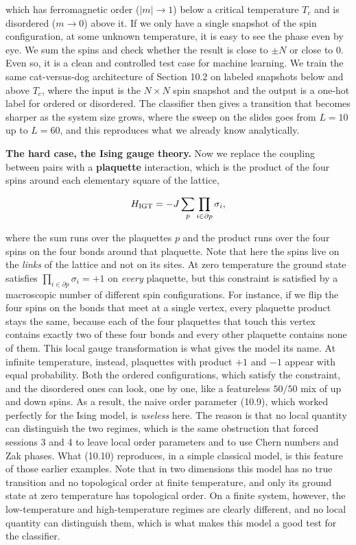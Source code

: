 which has ferromagnetic order ($|m|\to 1$) below a critical temperature $T_c$ and is disordered
($m\to 0$) above it. If we only have a single snapshot of the spin configuration, at some unknown
temperature, it is easy to see the phase even by eye. We sum the spins and check whether the
result is close to $\pm N$ or close to $0$. Even so, it is a clean and controlled test case for
machine learning. We train the same cat-versus-dog architecture of Section 10.2 on labeled
snapshots below and above $T_c$, where the input is the $N\times N$ spin snapshot and the output is
a one-hot label for ordered or disordered. The classifier then gives a transition that becomes
sharper as the system size grows, where the sweep on the slides goes from $L = 10$ up to $L = 60$,
and this reproduces what we already know analytically.

\textbf{The hard case, the Ising gauge theory.} Now we replace the coupling between pairs with a
\textbf{plaquette} interaction, which is the product of the four spins around each elementary square
of the lattice,

\begin{equation}
H_{\rm IGT} = -J\sum_{p} \prod_{i \in \partial p} \sigma_i,
\end{equation}

where the sum runs over the plaquettes $p$ and the product runs over the four spins on the four
bonds around that plaquette. Note that here the spins live on the \emph{links} of the lattice and
not on its sites. At zero temperature the ground state satisfies $\prod_{i\in\partial p}\sigma_i =
+1$ on \emph{every} plaquette, but this constraint is satisfied by a macroscopic number of different
spin configurations. For instance, if we flip the four spins on the bonds that meet at a single
vertex, every plaquette product stays the same, because each of the four plaquettes that touch this
vertex contains exactly two of these four bonds and every other plaquette contains none of them.
This local gauge transformation is what gives the model its name. At infinite temperature, instead,
plaquettes with product $+1$ and $-1$ appear with equal probability. Both the ordered
configurations, which satisfy the constraint, and the disordered ones can look, one by one, like a
featureless $50/50$ mix of up and down spins. As a result, the naive order parameter (10.9), which
worked perfectly for the Ising model, is \emph{useless} here. The reason is that no local quantity
can distinguish the two regimes, which is the same obstruction that forced sessions 3 and 4 to leave
local order parameters and to use Chern numbers and Zak phases. What (10.10) reproduces, in a simple
classical model, is this feature of those earlier examples. Note that in two dimensions this model
has no true transition and no topological order at finite temperature, and only its ground state at
zero temperature has topological order. On a finite system, however, the low-temperature and
high-temperature regimes are clearly different, and no local quantity can distinguish them, which
is what makes this model a good test for the classifier.

